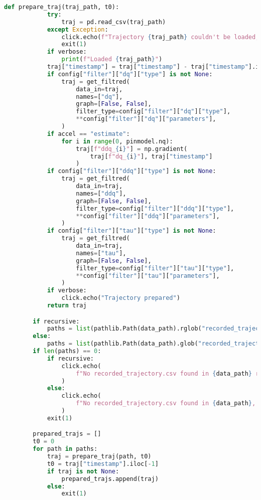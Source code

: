 \begin{lstlisting}[language=python, caption=\raggedright{identification/full.py}, frame=single]
        def prepare_traj(traj_path, t0):
            try:
                traj = pd.read_csv(traj_path)
            except Exception:
                click.echo(f"Trajectory {traj_path} couldn't be loaded, Aborting")
                exit(1)
            if verbose:
                print(f"Loaded {traj_path}")
            traj["timestamp"] = traj["timestamp"] - traj["timestamp"].iloc[0] + t0
            if config["filter"]["dq"]["type"] is not None:
                traj = get_filtred(
                    data_in=traj,
                    names=["dq"],
                    graph=[False, False],
                    filter_type=config["filter"]["dq"]["type"],
                    **config["filter"]["dq"]["parameters"],
                )
            if accel == "estimate":
                for i in range(0, pinmodel.nq):
                    traj[f"ddq_{i}"] = np.gradient(
                        traj[f"dq_{i}"], traj["timestamp"]
                    )
            if config["filter"]["ddq"]["type"] is not None:
                traj = get_filtred(
                    data_in=traj,
                    names=["ddq"],
                    graph=[False, False],
                    filter_type=config["filter"]["ddq"]["type"],
                    **config["filter"]["ddq"]["parameters"],
                )
            if config["filter"]["tau"]["type"] is not None:
                traj = get_filtred(
                    data_in=traj,
                    names=["tau"],
                    graph=[False, False],
                    filter_type=config["filter"]["tau"]["type"],
                    **config["filter"]["tau"]["parameters"],
                )
            if verbose:
                click.echo("Trajectory prepared")
            return traj

        if recursive:
            paths = list(pathlib.Path(data_path).rglob("recorded_trajectory.csv"))
        else:
            paths = list(pathlib.Path(data_path).glob("recorded_trajectory.csv"))
        if len(paths) == 0:
            if recursive:
                click.echo(
                    f"No recorded_trajectory.csv found in {data_path} recursively, Aborting"
                )
            else:
                click.echo(
                    f"No recorded_trajectory.csv found in {data_path}, Aborting"
                )
            exit(1)

        prepared_trajs = []
        t0 = 0
        for path in paths:
            traj = prepare_traj(path, t0)
            t0 = traj["timestamp"].iloc[-1]
            if traj is not None:
                prepared_trajs.append(traj)
            else:
                exit(1)


\end{lstlisting}
